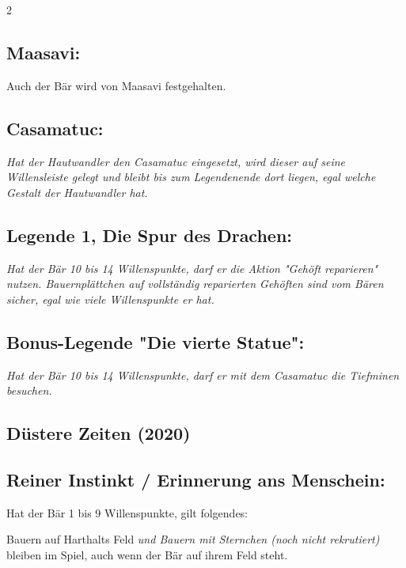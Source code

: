 \documentclass[10pt, a4paper, oneside]{book}
\newcommand{\fan}[1]{\textit{#1}}
\begin{document}
\begin{multicols*}{2}
\begin{bgcolor}[color-ag]
\subsection{Maasavi:}

Auch der Bär wird von Maasavi festgehalten.
\supercite{ag-begleitheft}


\subsection{Casamatuc:}

\fan{Hat der Hautwandler den Casamatuc eingesetzt, wird dieser auf seine Willensleiste gelegt und bleibt bis zum Legendenende dort liegen, egal welche Gestalt der Hautwandler hat.}


\subsection{Legende 1, Die Spur des Drachen:}

\fan{Hat der Bär 10 bis 14 Willenspunkte, darf er die Aktion "Gehöft reparieren" nutzen. Bauernplättchen auf vollständig reparierten Gehöften sind vom Bären sicher, egal wie viele Willenspunkte er hat.}

\subsection{Bonus-Legende "Die vierte Statue":}

\fan{Hat der Bär 10 bis 14 Willenspunkte, darf er mit dem Casamatuc die Tiefminen besuchen.}

\end{bgcolor}





\columnbreak

\begin{bgcolor}[color-dz]
\section{Düstere Zeiten (2020)}



\subsection{Reiner Instinkt / Erinnerung ans Menschein:}

Hat der Bär 1 bis 9 Willenspunkte, gilt folgendes:

\bullet{} Bauern auf Harthalts Feld \fan{und Bauern mit Sternchen (noch nicht rekrutiert)} bleiben im Spiel, auch wenn der Bär auf ihrem Feld steht.
\supercite{dz-begleitheft}


\end{bgcolor}
\end{multicols*}
\end{document}
